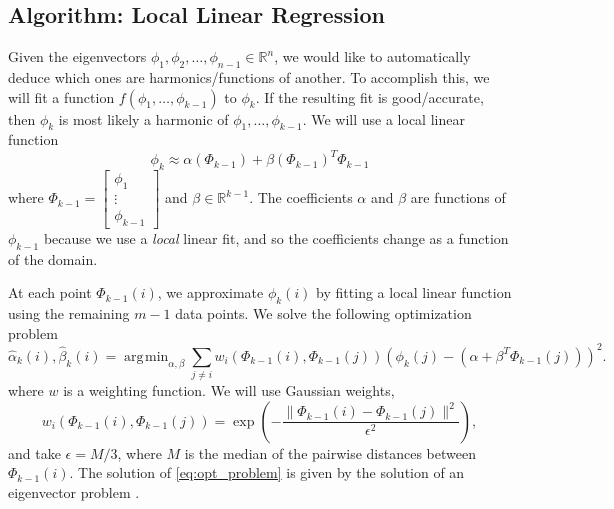 \documentclass[preprint]{elsarticle}
\DeclareMathOperator*{\argmin}{\arg\!\min}
\begin{document}


\subsection{Algorithm: Local Linear Regression}

Given the eigenvectors $\phi_1, \phi_2, \dots, \phi_{n-1} \in \mathbb{R}^n$, we would like to automatically deduce which ones are harmonics/functions of another. 
%
To accomplish this, we will fit a function $f(\phi_1, \dots, \phi_{k-1})$ to $\phi_{k}$. 
%
If the resulting fit is good/accurate, then $\phi_{k}$ is most likely a harmonic of $\phi_1, \dots, \phi_{k-1}$. 
%
We will use a local linear function 
\begin{equation}
\phi_k \approx \alpha( \Phi_{k-1}) + \beta(\Phi_{k-1})^T \Phi_{k-1}
\end{equation}
where 
%
$\Phi_{k-1} = \begin{bmatrix} \phi_1 \\ \vdots \\ \phi_{k-1} \end{bmatrix}$
and $\beta \in \mathbb{R}^{k-1}$. 
%
The coefficients $\alpha$ and $\beta$ are functions of $\phi_{k-1}$ because we use a {\em local} linear fit, and so the coefficients change as a function of the domain. 

At each point $\Phi_{k-1}(i)$, we approximate $\phi_k(i)$ by fitting a local linear function using the remaining $m-1$ data points. 
%
We solve the following optimization problem 
\begin{equation} \label{eq:opt_problem}
\hat{\alpha}_k (i) , \hat{\beta}_k(i)  = \argmin_{\alpha, \beta} \sum_{j \ne i} w_i(\Phi_{k-1}(i), \Phi_{k-1}(j)) \left( \phi_{k}(j) - (\alpha + \beta^T \Phi_{k-1}(j)) \right)^2.
\end{equation}
%
where $w$ is a weighting function.
%
We will use Gaussian weights, 
%
\begin{equation}
w_i(\Phi_{k-1}(i), \Phi_{k-1}(j))  = \exp \left( - \frac{\|\Phi_{k-1}(i) - \Phi_{k-1} (j) \|^2}{\epsilon^2} \right),
\end{equation}
%
and take $\epsilon = M / 3$, where $M$ is the median of the pairwise distances between $\Phi_{k-1}(i)$.
%
The solution of \eqref{eq:opt_problem} is given by the solution of an eigenvector problem \cite{...}.
\end{document}
